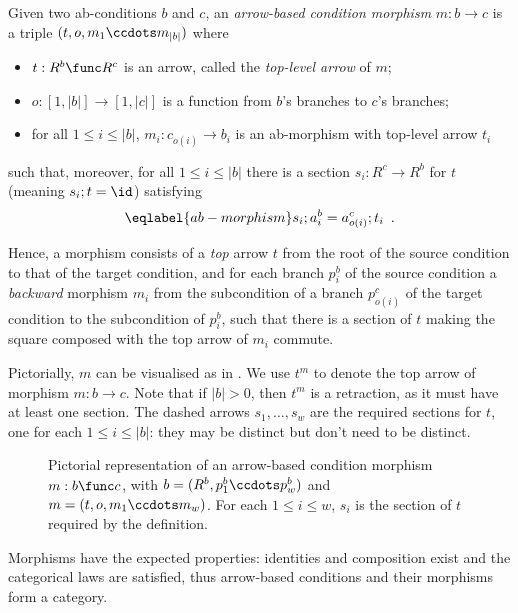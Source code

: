 \begin{definition}
  Given two ab-conditions $b$ and $c$, an \emph{arrow-based condition morphism} $m: b \to c$ is a triple $(t,o,m_1\ccdots m_{|b|})$ where
  \begin{itemize}
    \item $t:R^b\func R^c$ is an arrow, called the \emph{top-level arrow} of $m$;
	\item $o:[1,|b|]\to[1,|c|]$ is a function from $b$'s branches to $c$'s branches;
  \item for all $1\leq i\leq |b|$, $m_i:c_{o(i)}\to b_i$ is an ab-morphism with top-level arrow $t_i$
  \end{itemize}
such that, moreover, for all $1\leq i\leq |b|$ there is a section $s_i:R^c\to R^b$ for $t$ (meaning $s_i;t=\id$) satisfying
\begin{equation}\eqlabel{ab-morphism}
s_i;a^b_i=a^c_{o(i)};t_i \enspace.
\end{equation}
\end{definition}
%
Hence, a morphism consists of a \emph{top} arrow $t$ from the root of the source condition to that of the target condition, and for each branch $p^b_i$ of the source condition a \emph{backward} morphism $m_i$ from the subcondition of a branch $p^c_{o(i)}$ of the target condition to the subcondition of $p^b_i$, such that there is a section of $t$ making the square composed with the top arrow of $m_i$ commute.

Pictorially, $m$ can be visualised as in . We use $t^m$ to denote the top arrow of morphism $m:b\to c$. Note that if $|b|>0$, then $t^m$ is a retraction, as it must have at least one section.  The dashed arrows $s_1, \ldots, s_w$ are the required sections for $t$, one for each $1\leq i\leq |b|$: they may be distinct but don't need to be distinct.  
%
\begin{figure}
  \centering
  
  \caption{Pictorial representation of an arrow-based condition morphism $m:b\func c$, with $b=(R^b,p^b_1\ccdots p^b_w)$ and $m = (t,o,m_1\ccdots m_w)$. For each $1 \leq i \leq w$, $s_i$ is the section of $t$ required by the definition.}
\end{figure}

\medskip\noindent Morphisms have the expected properties: identities and composition exist and the categorical laws are satisfied, thus arrow-based conditions and their morphisms form a category.
%

